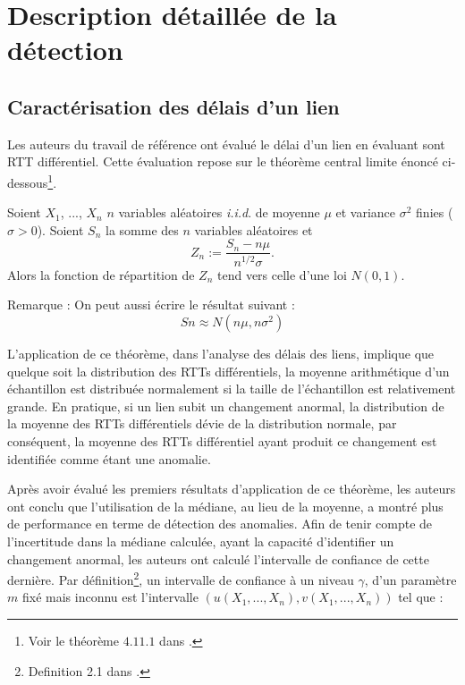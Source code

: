 

\section{Description détaillée de la détection}

\subsection{Caractérisation des délais d'un lien}
Les auteurs du travail de référence\cite{DBLP:journals/corr/FontugneAPB16} ont évalué le délai d'un lien en évaluant sont RTT différentiel. Cette évaluation repose sur le théorème central limite énoncé ci-dessous\footnote{Voir le théorème  $ 4.11.1 $ dans \cite{lefebvre2003cours}.}.

\begin{tcolorbox}
	Soient $X_1$, ..., $X_n$ $n$ variables aléatoires \textit{i.i.d}. de moyenne $\mu$ et variance $\sigma^2$ finies ($\sigma > 0$). Soient $S_n$ la somme des $n$ variables aléatoires et 
	\begin{equation}
	Z_n := \frac{S_n - n\mu}{n^{1/2} \sigma}.
	\end{equation} 
	Alors la fonction de répartition de $Z_n$ tend vers celle d'une loi $N(0,1)$.
	
	Remarque : On peut aussi écrire le résultat suivant :
	\begin{equation}
	   Sn \approx N(n\mu, n\sigma^2)
	\end{equation}
\end{tcolorbox}

 L'application de ce théorème, dans  l'analyse des délais des liens, implique que quelque soit la distribution des RTTs différentiels, la moyenne arithmétique d'un échantillon  est distribuée normalement si la taille de l'échantillon est relativement grande. En pratique,
si un lien subit un changement anormal, la distribution de la moyenne des RTTs différentiels dévie de la distribution normale, par conséquent, la moyenne des RTTs différentiel ayant produit ce changement est identifiée comme  étant une anomalie.

Après avoir évalué les premiers résultats d'application de ce théorème, les auteurs ont conclu que l'utilisation de la médiane,  au lieu de la moyenne, a montré plus de performance en terme de détection des anomalies.
Afin de tenir compte de l'incertitude dans la médiane calculée, ayant la capacité d'identifier un changement anormal, les auteurs ont  calculé  l'intervalle de confiance de cette dernière.
Par définition\footnote{Definition 2.1 dans \cite{leboudec2010performance}.},  un intervalle de confiance à un niveau $\gamma$,  d'un paramètre $m$ fixé mais inconnu est l'intervalle  $(u(X_1,...,X_n),v(X_1,...,X_n)) $ tel que  :

